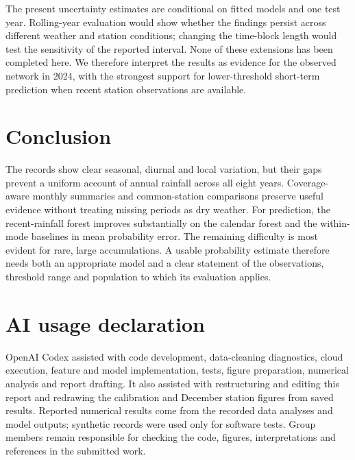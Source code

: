The present uncertainty estimates are conditional on fitted models and one test year. Rolling-year evaluation would show whether the findings persist across different weather and station conditions; changing the time-block length would test the sensitivity of the reported interval. None of these extensions has been completed here. We therefore interpret the results as evidence for the observed network in 2024, with the strongest support for lower-threshold short-term prediction when recent station observations are available.

\section{Conclusion}
The records show clear seasonal, diurnal and local variation, but their gaps prevent a uniform account of annual rainfall across all eight years. Coverage-aware monthly summaries and common-station comparisons preserve useful evidence without treating missing periods as dry weather. For prediction, the recent-rainfall forest improves substantially on the calendar forest and the within-mode baselines in mean probability error. The remaining difficulty is most evident for rare, large accumulations. A usable probability estimate therefore needs both an appropriate model and a clear statement of the observations, threshold range and population to which its evaluation applies.

\section*{AI usage declaration}
OpenAI Codex assisted with code development, data-cleaning diagnostics, cloud execution, feature and model implementation, tests, figure preparation, numerical analysis and report drafting. It also assisted with restructuring and editing this report and redrawing the calibration and December station figures from saved results. Reported numerical results come from the recorded data analyses and model outputs; synthetic records were used only for software tests. Group members remain responsible for checking the code, figures, interpretations and references in the submitted work.
